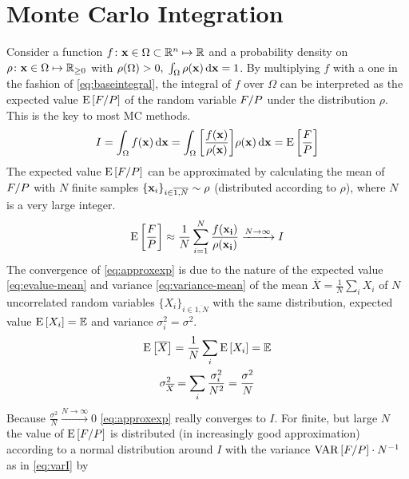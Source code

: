 \section{Monte Carlo Integration}%
\label{sec:mcint}

Consider a function
\(f\colon \vb{x}\in\Omega\subset\mathbb{R}^n\mapsto\mathbb{R}\) and a
probability density on
\(\rho\colon \vb{x}\in\Omega\mapsto\mathbb{R}_{\geq 0}\) with
\(\rho(\Omega) > 0,\; \int_{\Omega}\rho(\vb{x})\dd{\vb{x}} = 1\).  By
multiplying \(f\) with a one in the fashion of \cref{eq:baseintegral},
the integral of \(f\) over \(\Omega\) can be interpreted as the
expected value \(\operatorname{E}\qty[F/P]\) of the random variable \(F/P\) under
the distribution \(\rho\). This is the key to most MC methods.
%
\begin{equation}
  \label{eq:baseintegral}
  I = \int_\Omega f(\vb{x}) \dd{\vb{x}} = \int_\Omega
  \qty[\frac{f(\vb{x})}{\rho(\vb{x})}] \rho(\vb{x}) \dd{\vb{x}} = \operatorname{E}\qty[\frac{F}{P}]
\end{equation}
%
The expected value \(\operatorname{E}\qty[F/P]\) can be approximated by calculating
the mean of \(F/P\) with \(N\) finite samples
\(\{\vb{x}_i\}_{i\in\overline{1,N}}\sim\rho\) (distributed according
to \(\rho\)), where \(N\) is a very large integer.
%
\begin{equation}
  \label{eq:approxexp}
  \operatorname{E}\qty[\frac{F}{P}] \approx
  \frac{1}{N}\sum_{i=1}^N\frac{f(\vb{x_i})}{\rho(\vb{x_i})}
  \xrightarrow{N\rightarrow\infty} I
\end{equation}
%
The convergence of \cref{eq:approxexp} is due to the nature of the
expected value \cref{eq:evalue-mean} and
variance \cref{eq:variance-mean} of the mean
\(\overline{X} = \frac{1}{N}\sum_i X_i\) of \(N\) uncorrelated random
variables \(\{X_i\}_{i\in\overline{1,N}}\) with the same distribution,
expected value \(\operatorname{E}\qty[X_i]=\mathbb{E}\) and variance
\(\sigma_i^2 = \sigma^2\).
%
\begin{gather}
  \operatorname{E}\qty[\overline{X}] = \frac{1}{N}\sum_i\operatorname{E}\qty[X_i] = \mathbb{E} \label{eq:evalue-mean}\\
  \sigma^2_{\overline{X}} = \sum_i\frac{\sigma_i^2}{N^2} =
                            \frac{\sigma^2}{N}  \label{eq:variance-mean}
\end{gather}
%
Because \(\frac{\sigma^2}{N}\xrightarrow{N\rightarrow\infty} 0\)
\cref{eq:approxexp} really converges to \(I\). For finite, but large
\(N\) the value of \(\operatorname{E}\qty[F/P]\) is distributed (in increasingly
good approximation) according to a normal distribution around \(I\)
with the variance \(\operatorname{VAR}\qty[F/P]\cdot N^{-1}\) as in \cref{eq:varI} by
